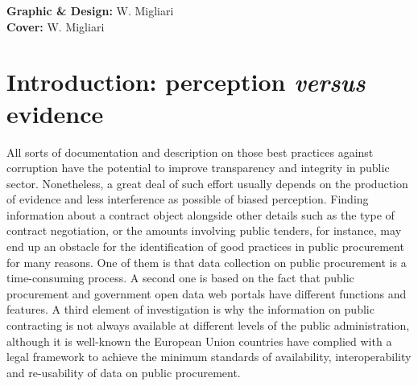 \documentclass[a4paper, twoside]{report}
\begin{document}
\thispagestyle{empty}
\hfill%
\begin{minipage}{18cm}
\vspace{2cm}
\noindent\textbf{Graphic \& Design:} W. Migliari \textsc{}\\
\noindent\textbf{Cover:} W. Migliari\\
\vspace{2cm}
\end{minipage}
\clearpage

\tableofcontents
{}
\thispagestyle{empty}
\cleardoublepage

\listoffigures

\listoftables





\chapter*{Introduction: perception \emph{versus} evidence}

All sorts of documentation and description on those best practices against corruption have the potential to improve transparency and integrity in public sector. Nonetheless, a great deal of such effort usually depends on the production of evidence and less interference as possible of biased perception. Finding information about a contract object alongside other details such as the type of contract negotiation, or the amounts involving public tenders, for instance, may end up an obstacle for the identification of good practices in public procurement for many reasons. One of them is that data collection on public procurement is a time-consuming process. A second one is based on the fact that public procurement and government open data web portals have different functions and features. A third element of investigation is why the information on public contracting is not always available at different levels of the public administration, although it is well-known the European Union countries have complied with a legal framework to achieve the minimum standards of availability, interoperability and re-usability of data on public procurement.\\ 
\end{document}
